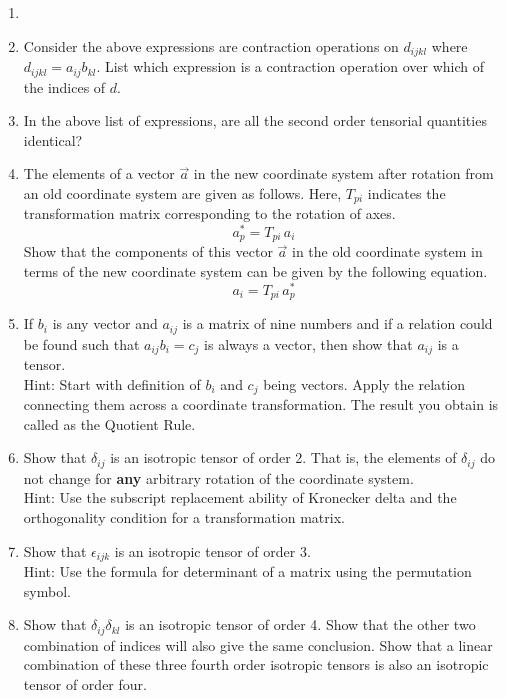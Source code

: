 

\begin{enumerate}{}{}

\item 

\item Consider the above expressions are contraction operations on $d_{ijkl}$ where $d_{ijkl} = a_{ij} b_{kl}$. List which expression is a contraction operation over which of the indices of $d$.

\item In the above list of expressions, are all the second order tensorial quantities identical?

\item The elements of a vector $\vec{a}$ in the new coordinate system after rotation from an old coordinate system are given as follows. Here, $T_{pi}$ indicates the transformation matrix corresponding to the rotation of axes. 
$$ a^*_p = T_{pi} \, a_i$$ 
Show that the components of this vector $\vec{a}$ in the old coordinate system in terms of the new coordinate system can be given by the following equation.
$$ a_i = T_{pi} \, a^*_p$$ 

\item If $b_i$ is any vector and $a_{ij}$ is a matrix of nine numbers and if a relation could be found such that $a_{ij} b_i = c_j$ is always a vector, then show that $a_{ij}$ is a tensor.\\
Hint: Start with definition of $b_i$ and $c_j$ being vectors. Apply the relation connecting them across a coordinate transformation. The result you obtain is called as the Quotient Rule.

\item Show that $\delta_{ij}$ is an isotropic tensor of order 2. That is, the elements of $\delta_{ij}$ do not change for {\bf any} arbitrary rotation of the coordinate system.\\
Hint: Use the subscript replacement ability of Kronecker delta and the orthogonality condition for a transformation matrix.

\item Show that $\epsilon_{ijk}$ is an isotropic tensor of order 3.\\
Hint: Use the formula for determinant of a matrix using the permutation symbol.

\item Show that $\delta_{ij} \delta_{kl}$ is an isotropic tensor of order 4. Show that the other two combination of indices will also give the same conclusion. Show that a linear combination of these three fourth order isotropic tensors is also an isotropic tensor of order four.

\end{enumerate}


